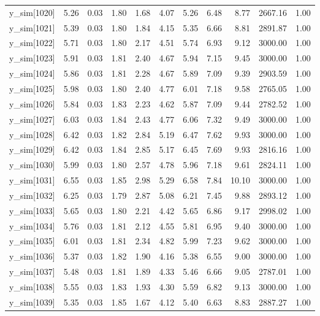 \begin{table}[ht]
\begin{tabular}{rrrrrrrrrrr}
  y\_sim[1020] & 5.26 & 0.03 & 1.80 & 1.68 & 4.07 & 5.26 & 6.48 & 8.77 & 2667.16 & 1.00 \\ 
  y\_sim[1021] & 5.39 & 0.03 & 1.80 & 1.84 & 4.15 & 5.35 & 6.66 & 8.81 & 2891.87 & 1.00 \\ 
  y\_sim[1022] & 5.71 & 0.03 & 1.80 & 2.17 & 4.51 & 5.74 & 6.93 & 9.12 & 3000.00 & 1.00 \\ 
  y\_sim[1023] & 5.91 & 0.03 & 1.81 & 2.40 & 4.67 & 5.94 & 7.15 & 9.45 & 3000.00 & 1.00 \\ 
  y\_sim[1024] & 5.86 & 0.03 & 1.81 & 2.28 & 4.67 & 5.89 & 7.09 & 9.39 & 2903.59 & 1.00 \\ 
  y\_sim[1025] & 5.98 & 0.03 & 1.80 & 2.40 & 4.77 & 6.01 & 7.18 & 9.58 & 2765.05 & 1.00 \\ 
  y\_sim[1026] & 5.84 & 0.03 & 1.83 & 2.23 & 4.62 & 5.87 & 7.09 & 9.44 & 2782.52 & 1.00 \\ 
  y\_sim[1027] & 6.03 & 0.03 & 1.84 & 2.43 & 4.77 & 6.06 & 7.32 & 9.49 & 3000.00 & 1.00 \\ 
  y\_sim[1028] & 6.42 & 0.03 & 1.82 & 2.84 & 5.19 & 6.47 & 7.62 & 9.93 & 3000.00 & 1.00 \\ 
  y\_sim[1029] & 6.42 & 0.03 & 1.84 & 2.85 & 5.17 & 6.45 & 7.69 & 9.93 & 2816.16 & 1.00 \\ 
  y\_sim[1030] & 5.99 & 0.03 & 1.80 & 2.57 & 4.78 & 5.96 & 7.18 & 9.61 & 2824.11 & 1.00 \\ 
  y\_sim[1031] & 6.55 & 0.03 & 1.85 & 2.98 & 5.29 & 6.58 & 7.84 & 10.10 & 3000.00 & 1.00 \\ 
  y\_sim[1032] & 6.25 & 0.03 & 1.79 & 2.87 & 5.08 & 6.21 & 7.45 & 9.88 & 2893.12 & 1.00 \\ 
  y\_sim[1033] & 5.65 & 0.03 & 1.80 & 2.21 & 4.42 & 5.65 & 6.86 & 9.17 & 2998.02 & 1.00 \\ 
  y\_sim[1034] & 5.76 & 0.03 & 1.81 & 2.12 & 4.55 & 5.81 & 6.95 & 9.40 & 3000.00 & 1.00 \\ 
  y\_sim[1035] & 6.01 & 0.03 & 1.81 & 2.34 & 4.82 & 5.99 & 7.23 & 9.62 & 3000.00 & 1.00 \\ 
  y\_sim[1036] & 5.37 & 0.03 & 1.82 & 1.90 & 4.16 & 5.38 & 6.55 & 9.00 & 3000.00 & 1.00 \\ 
  y\_sim[1037] & 5.48 & 0.03 & 1.81 & 1.89 & 4.33 & 5.46 & 6.66 & 9.05 & 2787.01 & 1.00 \\ 
  y\_sim[1038] & 5.55 & 0.03 & 1.83 & 1.93 & 4.30 & 5.59 & 6.82 & 9.13 & 3000.00 & 1.00 \\ 
  y\_sim[1039] & 5.35 & 0.03 & 1.85 & 1.67 & 4.12 & 5.40 & 6.63 & 8.83 & 2887.27 & 1.00 \\ 

\end{tabular}
\end{table}
